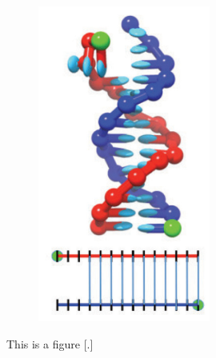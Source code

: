 \begin{figure}[ht]
\begin{centering}
\begin{subfigure}[t]{\dimexpr.2\linewidth-1.3em\relax}
  \includegraphics[width=.8\linewidth,valign=t]{Figures/hybridDiag5.png}
  \end{subfigure}
  \caption{This is a figure [.]}
  \label{fig:test}
  \end{centering}

\end{figure}

%


